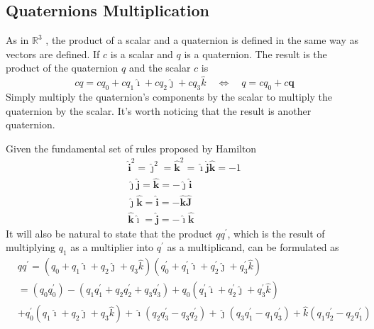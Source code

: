 \subsection{Quaternions Multiplication}
As in $\mathbb{R}^3$ , the product of a scalar and a quaternion is defined in the same way as vectors are defined. If $c$ is a scalar and $q$ is a quaternion. The result is the product of the quaternion $q$ and the scalar $c$ is
\begin{equation}
cq=cq_{0}+cq_{1} \hat{\imath}+cq_{2} \hat{\jmath}+cq_{3} \hat{k} \quad \Leftrightarrow \quad q=cq_{0}+c\boldsymbol{q}
\end{equation}
Simply multiply the quaternion's components by the scalar to multiply the quaternion by the scalar. It's worth noticing that the result is another quaternion.

Given the fundamental set of rules proposed by Hamilton 
\begin{equation}
\begin{gathered}
\hat{\boldsymbol{i}}^{2}=\hat{\boldsymbol{\jmath}}^{2}=\hat{\boldsymbol{k}}^{2}=\hat{\boldsymbol{\imath}}\hat{\boldsymbol{j}} \hat{\boldsymbol{k}}=-1 \\
\hat{\boldsymbol{\jmath}} \hat{\boldsymbol{j}}=\hat{\boldsymbol{k}}=-\hat{\boldsymbol{\jmath}} \hat{\boldsymbol{i}} \\
\hat{\boldsymbol{\jmath}} \hat{\boldsymbol{k}}=\hat{\boldsymbol{i}}=-\hat{\boldsymbol{k}} \hat{\boldsymbol{J}} \\
\hat{\boldsymbol{k}} \hat{\boldsymbol{\imath}}=\hat{\boldsymbol{j}}=-\hat{\boldsymbol{\imath}} \hat{\boldsymbol{k}}
\end{gathered}
\end{equation}
It will also be natural to state that the product $qq^{'}$, which is the result of multiplying $q_1$ as a multiplier into $q^'$  as a multiplicand, can be formulated as
\begin{equation}
\begin{aligned}
&q q^{\prime}=\left(q_{0}+q_{1} \hat{\imath}+q_{2} \hat{\jmath}+q_{3} \hat{k}\right)\left(q_{0}^{\prime}+q_{1}^{\prime} \hat{\imath}+q_{2}^{\prime} \hat{\jmath}+q_{3}^{\prime} \hat{k}\right) \\
&=\left(q_{0} q_{0}^{\prime}\right)-\left(q_{1} q_{1}^{\prime}+q_{2} q_{2}^{\prime}+q_{3} q_{3}^{\prime}\right)+q_{0}\left(q_{1}^{\prime} \hat{\imath}+q_{2}^{\prime} \hat{\jmath}+q_{3}^{\prime} \hat{k}\right) \\
&+q_{0}^{\prime}\left(q_{1} \hat{\imath}+q_{2} \hat{\jmath}+q_{3} \hat{k}\right)+\hat{\imath}\left(q_{2} q_{3}^{\prime}-q_{3} q_{2}^{\prime}\right)+\hat{\jmath}\left(q_{3} q_{1}^{\prime}-q_{1} q_{3}^{\prime}\right)+\hat{k}\left(q_{1} q_{2}^{\prime}-q_{2} q_{1}^{\prime}\right) \\
\end{aligned}
\end{equation}
